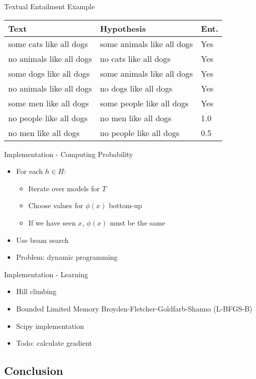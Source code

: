 \documentclass{beamer}
\newlength{\wideitemsep}
\let\olditem\item
\renewcommand{\item}{\setlength{\itemsep}{\wideitemsep}\olditem}
\begin{document}
\begin{frame}{Textual Entailment Example}
\begin{tabular}{|l|l|l|}
\hline
Text & Hypothesis & Ent.\\
\hline
some cats like all dogs & some animals like all dogs & Yes\\
no animals like all dogs & no cats like all dogs & Yes\\
some dogs like all dogs & some animals like all dogs & Yes\\
no animals like all dogs & no dogs like all dogs & Yes\\
some men like all dogs & some people like all dogs & Yes\\
\hline
no people like all dogs & no men like all dogs & 1.0\\
no men like all dogs & no people like all dogs & 0.5\\
\hline
\end{tabular}
\end{frame}

\begin{frame}{Implementation - Computing Probability}
  \begin{itemize}
  \item For each $h\in H$:
    \begin{itemize}
    \item Iterate over models for $T$
    \item Choose values for $\phi(x)$ bottom-up
    \item If we have seen $x$, $\phi(x)$ must be the same
    \end{itemize}
  \item Use beam search
  \item Problem: dynamic programming
  \end{itemize}
\end{frame}

\begin{frame}{Implementation - Learning}
  \begin{itemize}
  \item Hill climbing
  \item Bounded Limited Memory Broyden-Fletcher-Goldfarb-Shanno (L-BFGS-B)
  \item Scipy implementation 
  \item Todo: calculate gradient
  \end{itemize}
\end{frame}

\subsection{Conclusion}
\end{document}
